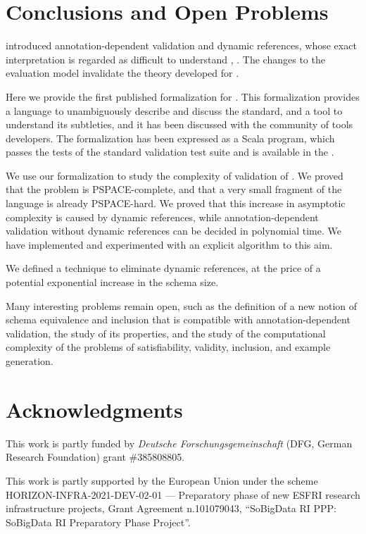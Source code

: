 \section{Conclusions and Open Problems}\label{sec:conclusion}

{\MJS} introduced annotation-dependent validation and dynamic references, whose exact interpretation
is regarded as difficult to understand \citeoneone, \citefiveseven.
The changes to the evaluation model invalidate the theory developed for {\cJS}.

Here we provide the first published formalization for {\mJS}. This formalization provides a language
to unambiguously describe and discuss the standard, and a tool to understand its subtleties, and
it has been discussed with the community of {\jsonsch} tools developers.
The formalization has been expressed as a Scala program, which passes the tests of the standard {\jsonsch}
validation test suite and is available in the {\FV}.

We use our formalization to study the complexity of validation of {\mJS}. We proved that the problem is 
PSPACE-complete, and that a very small fragment of the language is already PSPACE-hard.
We proved that this increase in asymptotic complexity is caused by dynamic references, while
annotation-dependent validation without dynamic references can be decided in polynomial time. We have
implemented and experimented with an explicit algorithm to this aim.

We defined a technique to eliminate dynamic references, at the price of a potential exponential increase
in the schema size. %

Many interesting problems remain open, such as the definition of a new notion of schema equivalence and inclusion that is compatible
with annotation-dependent validation, the study of its properties, and the study of the computational complexity of the problems of
satisfiability, validity, inclusion, and example generation.

\section*{Acknowledgments}
This work is partly funded by \emph{Deutsche For\-schungs\-gemein\-schaft} (DFG, German Research Foundation) grant \#385808805.

This work is partly supported by the European Union under the scheme HORIZON-INFRA-2021-DEV-02-01 --- Preparatory phase of new ESFRI research infrastructure projects, Grant Agreement n.101079043, ``SoBigData RI PPP: SoBigData RI Preparatory Phase Project''.

